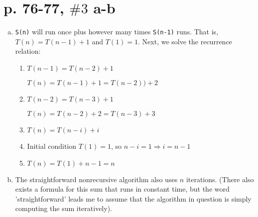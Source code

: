 \documentclass[a4paper,10pt]{article}
\begin{document}
\section*{p. 76-77, $\#3$ a-b}
\begin{enumerate}[(a)]
\item \verb|S(n)| will run once plus however many times \verb|S(n-1)| runs. That is, $T(n) = T(n-1) + 1$ and $T(1) = 1$. Next, we solve the recurrence relation:

	\begin{enumerate}[Step 1.]
		\item $T(n-1) = T(n-2) + 1$
	
		$T(n) = T(n-1) + 1 = T(n-2)) + 2$
		\item $T(n-2) = T(n-3) + 1$
	
		$T(n) = T(n-2) + 2  = T(n-3) + 3$
		\item $T(n) = T(n-i) + i$
	
		\item Initial condition $T(1) = 1$, so $n - i = 1 \Rightarrow i = n-1$
	
		\item $T(n) = T(1) + n-1 = \boxed{n}$
	\end{enumerate}
\item The straightforward nonrecursive algorithm also uses $n$ iterations. (There also exists a formula for this sum that runs in constant time, but the word 'straightforward' leads me to assume that the algorithm in question is simply computing the sum iteratively).
\end{enumerate}
\end{document}

